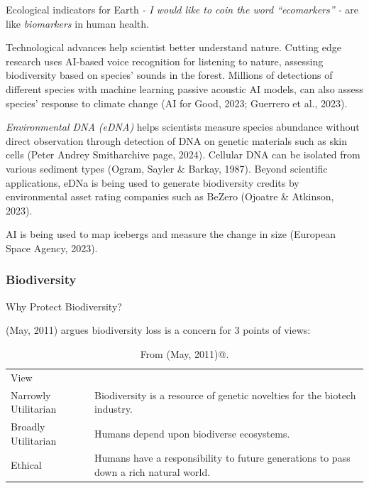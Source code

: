 \documentclass[
  letterpaper,
  DIV=11,
  numbers=noendperiod]{scrartcl}
\begin{document}
Ecological indicators for Earth \emph{- I would like to coin the word
``ecomarkers'' -} are like \emph{biomarkers} in human health.

Technological advances help scientist better understand nature. Cutting
edge research uses AI-based voice recognition for listening to nature,
assessing biodiversity based on species' sounds in the forest. Millions
of detections of different species with machine learning passive
acoustic AI models, can also assess species' response to climate change
(AI for Good, 2023; Guerrero et al., 2023).

\emph{Environmental DNA (eDNA)} helps scientists measure species
abundance without direct observation through detection of DNA on genetic
materials such as skin cells (Peter Andrey Smitharchive page, 2024).
Cellular DNA can be isolated from various sediment types (Ogram, Sayler
\& Barkay, 1987). Beyond scientific applications, eDNa is being used to
generate biodiversity credits by environmental asset rating companies
such as BeZero (Ojoatre \& Atkinson, 2023).

AI is being used to map icebergs and measure the change in size
(European Space Agency, 2023).

\subsubsection{Biodiversity}\label{biodiversity}

Why Protect Biodiversity?

(May, 2011) argues biodiversity loss is a concern for 3 points of views:

\begin{longtable}[]{@{}
  >{\raggedright\arraybackslash}p{}
  >{\raggedright\arraybackslash}p{}@{}}
\caption{From (May, 2011)@.}\tabularnewline
\toprule\noalign{}
\endfirsthead
\endhead
\bottomrule\noalign{}
\endlastfoot
View & \\
Narrowly Utilitarian & Biodiversity is a resource of genetic novelties
for the biotech industry. \\
Broadly Utilitarian & Humans depend upon biodiverse ecosystems. \\
Ethical & Humans have a responsibility to future generations to pass
down a rich natural world. \\
\end{longtable}
\end{document}
